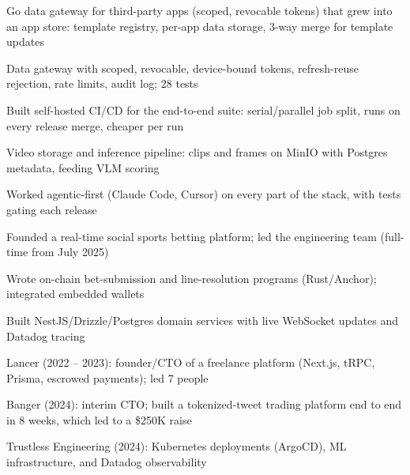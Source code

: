 \documentclass[print]{jack-resume}
\begin{document}
\begin{tightemize}
    \item Go data gateway for third-party apps (scoped, revocable tokens) that grew into an app store: template registry, per-app data storage, 3-way merge for template updates
    \item Data gateway with scoped, revocable, device-bound tokens, refresh-reuse rejection, rate limits, audit log; 28 tests
    \item Built self-hosted CI/CD for the end-to-end suite: serial/parallel job split, runs on every release merge, cheaper per run
    \item Video storage and inference pipeline: clips and frames on MinIO with Postgres metadata, feeding VLM scoring
    \item Worked agentic-first (Claude Code, Cursor) on every part of the stack, with tests gating each release
\end{tightemize}
\sectionsep

\begin{tightemize}
    \item Founded a real-time social sports betting platform; led the engineering team (full-time from July 2025)
    \item Wrote on-chain bet-submission and line-resolution programs (Rust/Anchor); integrated embedded wallets
    \item Built NestJS/Drizzle/Postgres domain services with live WebSocket updates and Datadog tracing
\end{tightemize}
\sectionsep

\begin{tightemize}
    \item Lancer (2022 -- 2023): founder/CTO of a freelance platform (Next.js, tRPC, Prisma, escrowed payments); led 7 people
    \item Banger (2024): interim CTO; built a tokenized-tweet trading platform end to end in 8 weeks, which led to a \$250K raise
    \item Trustless Engineering (2024): Kubernetes deployments (ArgoCD), ML infrastructure, and Datadog observability
\end{tightemize}
\sectionsep
\end{document}
